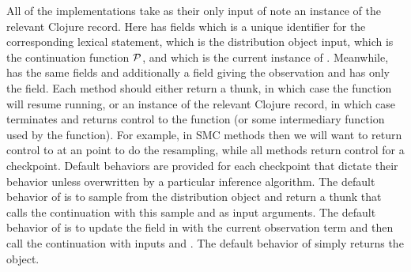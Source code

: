 All of the \checkpoint implementations
take as their only input of note an instance of the relevant Clojure record.  Here  has
fields  which is a unique identifier for the corresponding lexical \sample statement, 
which is the distribution object input,  which is the continuation function $\mathcal{P}$, and 
which is the current instance of \angstate.  Meanwhile,  has the same fields and additionally
a  field giving the observation and  has only the  field.  Each
\checkpoint method should either return a thunk, in which case the  function will resume running,
or an instance of the relevant Clojure record, in which case  terminates and returns control to the \anginfer
function (or some intermediary function used by the \anginfer function).  For example, in SMC methods
then we will want to return control to \anginfer at an \observe point to do the resampling, while all methods
return control for a  checkpoint.
Default behaviors are provided for each checkpoint that dictate their behavior unless overwritten by
a particular inference algorithm.  The default behavior of \sample is to sample from the distribution
object and return a thunk that calls the continuation with this sample and \angstate as input arguments.
The default behavior of \observe is to update the  field in \angstate with the current
observation term and then call the continuation with inputs  and \angstate.  The default behavior
of  simply returns the  object.
